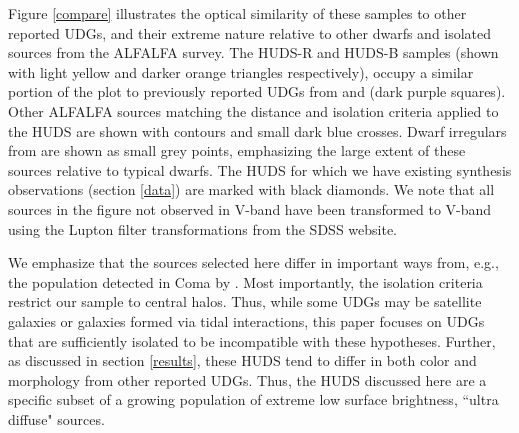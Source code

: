 \documentclass[twocolumn]{aastex6}
\begin{document}

Figure \ref{compare} illustrates the optical similarity of these samples to other reported UDGs, and their extreme nature relative to other dwarfs and isolated sources from the ALFALFA survey. The HUDS-R and HUDS-B samples (shown with light yellow and darker orange triangles respectively), occupy a similar portion of the plot to previously reported UDGs from \cite{vandokkum15a} and \cite{roman16a} (dark purple squares). Other ALFALFA sources matching the distance and isolation criteria applied to the HUDS are shown with contours and small dark blue crosses. Dwarf irregulars from \cite{hunter06a} are shown as small grey points, emphasizing the large extent of these sources relative to typical dwarfs. 
The HUDS for which we have existing synthesis observations (section \ref{data}) are marked with black diamonds. 
We note that all sources in the figure not observed in V-band have been transformed to V-band using the Lupton filter transformations from the SDSS website\footnotemark[1].


We emphasize that the sources selected here differ in important ways from, e.g., the population detected in Coma by \cite{vandokkum15a}. Most importantly, the isolation criteria restrict our sample to central halos. Thus, while some UDGs may be satellite galaxies or galaxies formed via tidal interactions, this paper focuses on UDGs that are sufficiently isolated to be incompatible with these hypotheses. Further, as discussed in section \ref{results}, these HUDS tend to differ in both color and morphology from other reported UDGs. Thus, the HUDS discussed here are a specific subset of a growing population of extreme low surface brightness, ``ultra diffuse" sources. 
\end{document}
